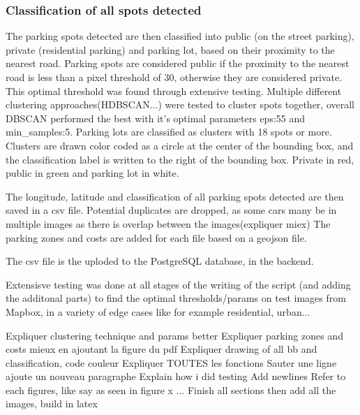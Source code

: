 \subsubsection{Classification of all spots detected}
The parking spots detected are then classified into public (on the street parking), private (residential parking) and parking lot, based on their proximity to the nearest road.
Parking spots are considered public if the proximity to the nearest road is less than a pixel threshold of 30, otherwise they are considered private. This optimal threshold was found through extensive testing.
Multiple different clustering approaches(HDBSCAN...) were tested to cluster spots together, overall DBSCAN performed the best with it's optimal parameters eps:55 and min_samples:5.
Parking lots are classified as clusters with 18 spots or more.
Clusters are drawn color coded as a circle at the center of the bounding box, and the classification label is written to the right of the bounding box. Private in red, public in green and parking lot in white.

The longitude, latitude and classification of all parking spots detected are then saved in a csv file.
Potential duplicates are dropped, as some cars many be in multiple images as there is overlap between the images(expliquer miex)
The parking zones and costs are added for each file based on a geojson file.

The csv file is the uploded to the PostgreSQL database, in the backend.

Extensisve testing was done at all stages of the writing of the script (and adding the additonal parts) to find the optimal thresholds/params on test images from Mapbox, in a variety of edge cases like for example residential, urban...



Expliquer clustering technique and params better
Expliquer parking zones and costs mieux en ajoutant la figure du pdf
Expliquer drawing of all bb and classification, code couleur
Expliquer TOUTES les fonctions
Sauter une ligne ajoute un nouveau paragraphe
Explain how i did testing
Add newlines
Refer to each figures, like say as seen in figure x ...
Finish all sections then add all the images, build in latex